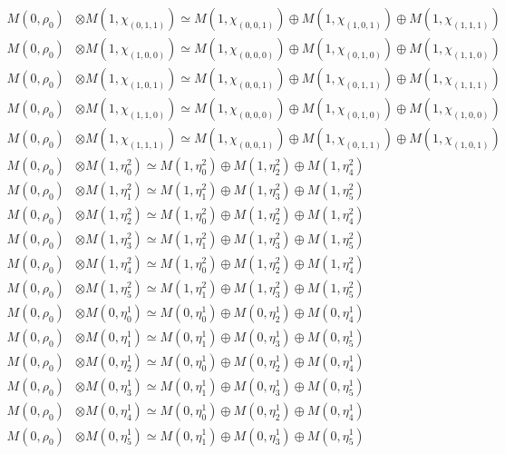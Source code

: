 \begin{align*}
M(0,\rho_{0}) &\otimes M(1,\chi_{(0,1,1)}) \simeq M(1,\chi_{(0,0,1)}) \oplus M(1,\chi_{(1,0,1)}) \oplus M(1,\chi_{(1,1,1)}) \\
M(0,\rho_{0}) &\otimes M(1,\chi_{(1,0,0)}) \simeq M(1,\chi_{(0,0,0)}) \oplus M(1,\chi_{(0,1,0)}) \oplus M(1,\chi_{(1,1,0)}) \\
M(0,\rho_{0}) &\otimes M(1,\chi_{(1,0,1)}) \simeq M(1,\chi_{(0,0,1)}) \oplus M(1,\chi_{(0,1,1)}) \oplus M(1,\chi_{(1,1,1)}) \\
M(0,\rho_{0}) &\otimes M(1,\chi_{(1,1,0)}) \simeq M(1,\chi_{(0,0,0)}) \oplus M(1,\chi_{(0,1,0)}) \oplus M(1,\chi_{(1,0,0)}) \\
M(0,\rho_{0}) &\otimes M(1,\chi_{(1,1,1)}) \simeq M(1,\chi_{(0,0,1)}) \oplus M(1,\chi_{(0,1,1)}) \oplus M(1,\chi_{(1,0,1)}) \\
M(0,\rho_{0}) &\otimes M(1,\eta^{2}_{0}) \simeq M(1,\eta^{2}_{0}) \oplus M(1,\eta^{2}_{2}) \oplus M(1,\eta^{2}_{4}) \\
M(0,\rho_{0}) &\otimes M(1,\eta^{2}_{1}) \simeq M(1,\eta^{2}_{1}) \oplus M(1,\eta^{2}_{3}) \oplus M(1,\eta^{2}_{5}) \\
M(0,\rho_{0}) &\otimes M(1,\eta^{2}_{2}) \simeq M(1,\eta^{2}_{0}) \oplus M(1,\eta^{2}_{2}) \oplus M(1,\eta^{2}_{4}) \\
M(0,\rho_{0}) &\otimes M(1,\eta^{2}_{3}) \simeq M(1,\eta^{2}_{1}) \oplus M(1,\eta^{2}_{3}) \oplus M(1,\eta^{2}_{5}) \\
M(0,\rho_{0}) &\otimes M(1,\eta^{2}_{4}) \simeq M(1,\eta^{2}_{0}) \oplus M(1,\eta^{2}_{2}) \oplus M(1,\eta^{2}_{4}) \\
M(0,\rho_{0}) &\otimes M(1,\eta^{2}_{5}) \simeq M(1,\eta^{2}_{1}) \oplus M(1,\eta^{2}_{3}) \oplus M(1,\eta^{2}_{5}) \\
M(0,\rho_{0}) &\otimes M(0,\eta^{1}_{0}) \simeq M(0,\eta^{1}_{0}) \oplus M(0,\eta^{1}_{2}) \oplus M(0,\eta^{1}_{4}) \\
M(0,\rho_{0}) &\otimes M(0,\eta^{1}_{1}) \simeq M(0,\eta^{1}_{1}) \oplus M(0,\eta^{1}_{3}) \oplus M(0,\eta^{1}_{5}) \\
M(0,\rho_{0}) &\otimes M(0,\eta^{1}_{2}) \simeq M(0,\eta^{1}_{0}) \oplus M(0,\eta^{1}_{2}) \oplus M(0,\eta^{1}_{4}) \\
M(0,\rho_{0}) &\otimes M(0,\eta^{1}_{3}) \simeq M(0,\eta^{1}_{1}) \oplus M(0,\eta^{1}_{3}) \oplus M(0,\eta^{1}_{5}) \\
M(0,\rho_{0}) &\otimes M(0,\eta^{1}_{4}) \simeq M(0,\eta^{1}_{0}) \oplus M(0,\eta^{1}_{2}) \oplus M(0,\eta^{1}_{4}) \\
M(0,\rho_{0}) &\otimes M(0,\eta^{1}_{5}) \simeq M(0,\eta^{1}_{1}) \oplus M(0,\eta^{1}_{3}) \oplus M(0,\eta^{1}_{5}) \\

\end{align*}
